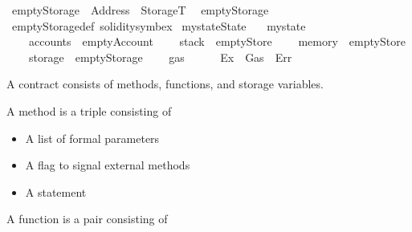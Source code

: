 \begin{isabellebody}
\endisatagproof
{\isafoldproof}%
%
\isadelimproof
%
\endisadelimproof
\isanewline
\isanewline
{}\isamarkupfalse%
\ emptyStorage\ {\isacharcolon}{\kern0pt}{\isacharcolon}{\kern0pt}\ {\isachardoublequoteopen}Address\ {\isasymRightarrow}\ StorageT{\isachardoublequoteclose}\isanewline
{}\isanewline
\ \ {\isachardoublequoteopen}emptyStorage\ {\isacharunderscore}{\kern0pt}\ {\isacharequal}{\kern0pt}\ {\isacharbraceleft}{\kern0pt}{\isachardollar}{\kern0pt}{\isachardollar}{\kern0pt}{\isacharbraceright}{\kern0pt}{\isachardoublequoteclose}\isanewline
\isanewline
{}\isamarkupfalse%
\ emptyStorage{\isacharunderscore}{\kern0pt}def\ {\isacharbrackleft}{\kern0pt}solidity{\isacharunderscore}{\kern0pt}symbex{\isacharbrackright}{\kern0pt}\isanewline
\isanewline
{}\isamarkupfalse%
\ mystate{\isacharcolon}{\kern0pt}{\isacharcolon}{\kern0pt}State\isanewline
\ \ \ {\isachardoublequoteopen}mystate\ {\isasymequiv}\ {\isasymlparr}\isanewline
\ \ \ \ accounts\ {\isacharequal}{\kern0pt}\ emptyAccount{\isacharcomma}{\kern0pt}\isanewline
\ \ \ \ stack\ {\isacharequal}{\kern0pt}\ emptyStore{\isacharcomma}{\kern0pt}\isanewline
\ \ \ \ memory\ {\isacharequal}{\kern0pt}\ emptyStore{\isacharcomma}{\kern0pt}\isanewline
\ \ \ \ storage\ {\isacharequal}{\kern0pt}\ emptyStorage{\isacharcomma}{\kern0pt}\isanewline
\ \ \ \ gas\ {\isacharequal}{\kern0pt}\ {}\isanewline
\ \ {\isasymrparr}{\isachardoublequoteclose}\isanewline
\isanewline
{}\isamarkupfalse%
\ Ex\ {\isacharequal}{\kern0pt}\ Gas\ {\isacharbar}{\kern0pt}\ Err%
\isadelimdocument
%
\endisadelimdocument
%
\isatagdocument
%
\isamarkuptrue%
%
\endisatagdocument
{\isafolddocument}%
%
\isadelimdocument
%
\endisadelimdocument
%
\begin{isamarkuptext}%
A contract consists of methods, functions, and storage variables.

A method is a triple consisting of

%
\begin{itemize}%
\item A list of formal parameters

\item A flag to signal external methods

\item A statement%
\end{itemize}


A function is a pair consisting of


\end{isamarkuptext}
\end{isabellebody}
